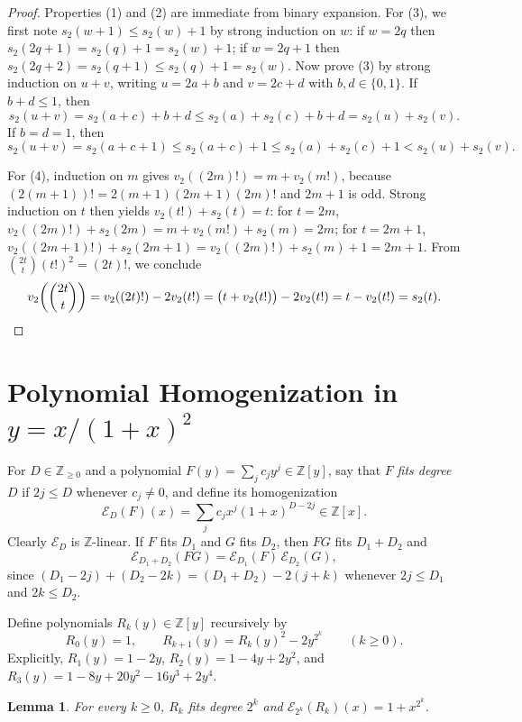 \documentclass[11pt]{article}
\newtheorem{lemma}[theorem]{Lemma}
\theoremstyle{remark}
\begin{document}
\begin{proof}
Properties (1) and (2) are immediate from binary expansion. For (3), we first note $s_2(w+1) \le s_2(w) + 1$ by strong induction on $w$: if $w = 2q$ then $s_2(2q+1) = s_2(q) + 1 = s_2(w) + 1$; if $w = 2q+1$ then $s_2(2q+2) = s_2(q+1) \le s_2(q) + 1 = s_2(w)$. Now prove (3) by strong induction on $u+v$, writing $u = 2a+b$ and $v = 2c+d$ with $b, d \in \{0, 1\}$. If $b+d \le 1$, then
\[
  s_2(u+v) = s_2(a+c) + b + d \le s_2(a) + s_2(c) + b + d = s_2(u) + s_2(v).
\]
If $b = d = 1$, then
\[
  s_2(u+v) = s_2(a+c+1) \le s_2(a+c) + 1 \le s_2(a) + s_2(c) + 1 < s_2(u) + s_2(v).
\]

For (4), induction on $m$ gives $v_2((2m)!) = m + v_2(m!)$, because $(2(m+1))! = 2(m+1)(2m+1)(2m)!$ and $2m+1$ is odd. Strong induction on $t$ then yields $v_2(t!) + s_2(t) = t$: for $t = 2m$, $v_2((2m)!) + s_2(2m) = m + v_2(m!) + s_2(m) = 2m$; for $t = 2m+1$, $v_2((2m+1)!) + s_2(2m+1) = v_2((2m)!) + s_2(m) + 1 = 2m+1$. From $\binom{2t}{t}(t!)^2 = (2t)!$, we conclude
\[
  v_2\!\left(\binom{2t}{t}\right) = v_2((2t)!) - 2v_2(t!) = \bigl(t + v_2(t!)\bigr) - 2v_2(t!) = t - v_2(t!) = s_2(t). \qedhere
\]
\end{proof}

\section{Polynomial Homogenization in $y = x/(1+x)^2$}

For $D \in \mathbb{Z}_{\ge 0}$ and a polynomial $F(y) = \sum_j c_j y^j \in \mathbb{Z}[y]$, say that $F$ \emph{fits degree $D$} if $2j \le D$ whenever $c_j \ne 0$, and define its homogenization
\[
  \mathcal{E}_D(F)(x) = \sum_{j} c_j x^j (1 + x)^{D - 2j} \in \mathbb{Z}[x].
\]
Clearly $\mathcal{E}_D$ is $\mathbb{Z}$-linear. If $F$ fits $D_1$ and $G$ fits $D_2$, then $FG$ fits $D_1 + D_2$ and
\[
  \mathcal{E}_{D_1 + D_2}(FG) = \mathcal{E}_{D_1}(F)\,\mathcal{E}_{D_2}(G),
\]
since $(D_1 - 2j) + (D_2 - 2k) = (D_1 + D_2) - 2(j+k)$ whenever $2j \le D_1$ and $2k \le D_2$.

Define polynomials $R_k(y) \in \mathbb{Z}[y]$ recursively by
\[
  R_0(y) = 1, \qquad R_{k+1}(y) = R_k(y)^2 - 2 y^{2^k} \qquad (k \ge 0).
\]
Explicitly, $R_1(y) = 1 - 2y$, $R_2(y) = 1 - 4y + 2y^2$, and $R_3(y) = 1 - 8y + 20y^2 - 16y^3 + 2y^4$.

\begin{lemma}\label{lem:Rk}
For every $k \ge 0$, $R_k$ fits degree $2^k$ and $\mathcal{E}_{2^k}(R_k)(x) = 1 + x^{2^k}$.
\end{lemma}
\end{document}
